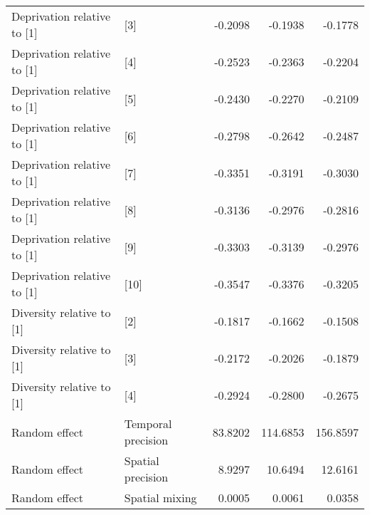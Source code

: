 \begin{table}[ht]
\begin{tabular}{llrrr}
  Deprivation relative to [1] & [3] & -0.2098 & -0.1938 & -0.1778 \\ 
  Deprivation relative to [1] & [4] & -0.2523 & -0.2363 & -0.2204 \\ 
  Deprivation relative to [1] & [5] & -0.2430 & -0.2270 & -0.2109 \\ 
  Deprivation relative to [1] & [6] & -0.2798 & -0.2642 & -0.2487 \\ 
  Deprivation relative to [1] & [7] & -0.3351 & -0.3191 & -0.3030 \\ 
  Deprivation relative to [1] & [8] & -0.3136 & -0.2976 & -0.2816 \\ 
  Deprivation relative to [1] & [9] & -0.3303 & -0.3139 & -0.2976 \\ 
  Deprivation relative to [1] & [10] & -0.3547 & -0.3376 & -0.3205 \\ 
  Diversity relative to [1] & [2] & -0.1817 & -0.1662 & -0.1508 \\ 
  Diversity relative to [1] & [3] & -0.2172 & -0.2026 & -0.1879 \\ 
  Diversity relative to [1] & [4] & -0.2924 & -0.2800 & -0.2675 \\ 
  Random effect & Temporal precision & 83.8202 & 114.6853 & 156.8597 \\ 
  Random effect & Spatial precision & 8.9297 & 10.6494 & 12.6161 \\ 
  Random effect & Spatial mixing & 0.0005 & 0.0061 & 0.0358 \\ 
   \hline
\end{tabular}
\end{table}
